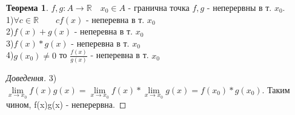 \documentclass[14pt,a4paper]{scrartcl}
\theoremstyle{definition}
\newtheorem*{teo}{Теорема}
\theoremstyle{remark}
\theoremstyle{definition}
\theoremstyle{definition}
\begin{document}
\begin{teo}
  $f,g:A\to\mathbb{R} \quad x_0\in A$ - гранична точка
  \quad $f,g$ - неперервны в т. $x_0$.\\
  1)$\forall c \in \mathbb{R}\qquad cf(x)$ - неперевна в т. $x_0$\\
  2)$f(x)+g(x)$ - неперевна в т. $x_0$\\
  3)$f(x)*g(x)$ - неперевна в т. $x_0$\\
  4)$g(x_0)\neq 0$ то $\frac{f(x)}{g(x)} $ - неперевна в т. $x_0$\\
\end{teo}

\begin{proof}[Доведення]
  3) $ \lim\limits_{x\to x_0}{f(x)g(x)} =  \lim\limits_{x\to x_0}{f(x)}* \lim\limits_{x\to x_0}{g(x)} = f(x_0)*g(x_0)$. Таким чином, f(x)g(x) - неперервна.
\end{proof}
\end{document}
